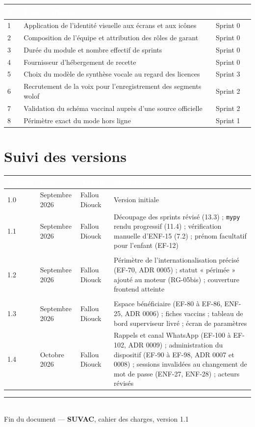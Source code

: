\documentclass[11pt,a4paper]{article}
\newcommand{\hd}[1]{\textcolor{white}{\sffamily\bfseries\small #1}}
\newcommand{\rowhead}{\rowcolor{primary}}
\begin{document}
\noindent
\begin{tabularx}{\textwidth}{@{}C{1.3cm} L C{3.2cm}@{}}
\toprule
\rowhead \hd{N\textsuperscript{o}} & \hd{Point à trancher} & \hd{Échéance} \\
 & Application de l'identité visuelle aux écrans et aux icônes & Sprint 0 \\
2 & Composition de l'équipe et attribution des rôles de garant & Sprint 0 \\
3 & Durée du module et nombre effectif de sprints & Sprint 0 \\
4 & Fournisseur d'hébergement de recette & Sprint 0 \\
5 & Choix du modèle de synthèse vocale au regard des licences & Sprint 3 \\
6 & Recrutement de la voix pour l'enregistrement des segments wolof & Sprint 2 \\
7 & Validation du schéma vaccinal auprès d'une source officielle & Sprint 2 \\
8 & Périmètre exact du mode hors ligne & Sprint 1 \\
\bottomrule
\end{tabularx}

\section{Suivi des versions}

\noindent
\begin{tabularx}{\textwidth}{@{}C{1.6cm} R{3cm} R{3.4cm} L@{}}
\toprule
\rowhead \hd{Version} & \hd{Date} & \hd{Auteur} & \hd{Modifications} \\
 & Septembre 2026 & Fallou Diouck & Version initiale \\
1.1 & Septembre 2026 & Fallou Diouck & Découpage des sprints révisé (13.3) ; \texttt{mypy} rendu progressif (11.4) ; vérification manuelle d'ENF-15 (7.2) ; prénom facultatif pour l'enfant (EF-12) \\
 &  &  &  \\
1.2 & Septembre 2026 & Fallou Diouck & Périmètre de l'internationalisation précisé (EF-70, ADR 0005) ; statut « périmée » ajouté au moteur (RG-05bis) ; couverture frontend atteinte \\
 &  &  &  \\
1.3 & Septembre 2026 & Fallou Diouck & Espace bénéficiaire (EF-80 à EF-86, ENF-25, ADR 0006) ; fiches vaccins ; tableau de bord superviseur livré ; écran de paramètres \\
1.4 & Octobre 2026 & Fallou Diouck & Rappels et canal WhatsApp (EF-100 à EF-102, ADR 0009) ; administration du dispositif (EF-90 à EF-98, ADR 0007 et 0008) ; sessions invalidées au changement de mot de passe (ENF-27, ENF-28) ; acteurs révisés \\
\bottomrule
\end{tabularx}

\vspace{1.4cm}
\begin{center}
{\color{rulegray}\rule{0.35\textwidth}{0.6pt}}\\[6pt]
{\sffamily\footnotesize\color{neutral}
Fin du document — \textbf{SUVAC}, cahier des charges, version 1.1}
\end{center}
\end{document}
